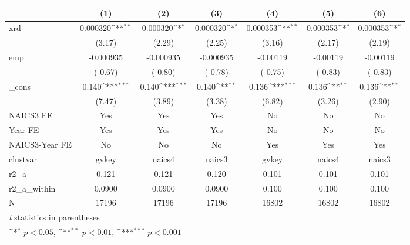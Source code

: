 {
\def\sym#1{\ifmmode^{#1}\else\(^{#1}\)\fi}
\begin{tabular}{l*{6}{c}}
\hline\hline
            &\multicolumn{1}{c}{(1)}         &\multicolumn{1}{c}{(2)}         &\multicolumn{1}{c}{(3)}         &\multicolumn{1}{c}{(4)}         &\multicolumn{1}{c}{(5)}         &\multicolumn{1}{c}{(6)}         \\
\hline
xrd         &    0.000320\sym{**} &    0.000320\sym{*}  &    0.000320\sym{*}  &    0.000353\sym{**} &    0.000353\sym{*}  &    0.000353\sym{*}  \\
            &      (3.17)         &      (2.29)         &      (2.25)         &      (3.16)         &      (2.17)         &      (2.19)         \\
[1em]
emp         &   -0.000935         &   -0.000935         &   -0.000935         &    -0.00119         &    -0.00119         &    -0.00119         \\
            &     (-0.67)         &     (-0.80)         &     (-0.78)         &     (-0.75)         &     (-0.83)         &     (-0.83)         \\
[1em]
\_cons      &       0.140\sym{***}&       0.140\sym{***}&       0.140\sym{**} &       0.136\sym{***}&       0.136\sym{**} &       0.136\sym{**} \\
            &      (7.47)         &      (3.89)         &      (3.38)         &      (6.82)         &      (3.26)         &      (2.90)         \\
[1em]
NAICS3 FE   &         Yes         &         Yes         &         Yes         &          No         &          No         &          No         \\
[1em]
Year FE     &         Yes         &         Yes         &         Yes         &          No         &          No         &          No         \\
[1em]
NAICS3-Year FE&          No         &          No         &          No         &         Yes         &         Yes         &         Yes         \\
\hline
clustvar    &       gvkey         &      naics4         &      naics3         &       gvkey         &      naics4         &      naics3         \\
r2\_a        &       0.121         &       0.121         &       0.120         &       0.101         &       0.101         &       0.101         \\
r2\_a\_within &      0.0900         &      0.0900         &      0.0900         &       0.100         &       0.100         &       0.100         \\
N           &       17196         &       17196         &       17196         &       16802         &       16802         &       16802         \\
\hline\hline
\multicolumn{7}{l}{\footnotesize \textit{t} statistics in parentheses}\\
\multicolumn{7}{l}{\footnotesize \sym{*} \(p<0.05\), \sym{**} \(p<0.01\), \sym{***} \(p<0.001\)}\\
\end{tabular}
}
